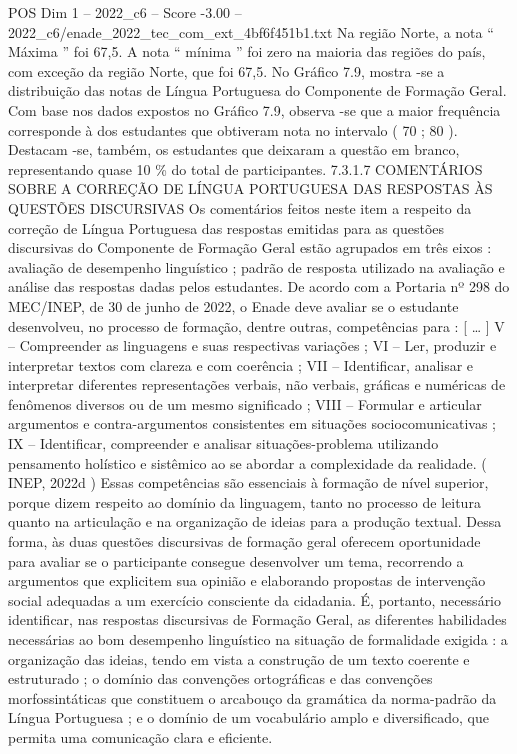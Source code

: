 \begin{textsample}{POS Dim 1 – 2022\_c6 – Score -3.00 – 2022\_c6/enade\_2022\_tec\_com\_ext\_4bf6f451b1.txt}
Na região Norte, a nota “ Máxima ” foi 67,5.
A nota “ mínima ” foi zero na maioria das regiões do país, com exceção da região Norte, que foi 67,5.
No Gráfico 7.9, mostra -se a distribuição das notas de Língua Portuguesa do Componente de Formação Geral.
Com base nos dados expostos no Gráfico 7.9, observa -se que a maior frequência corresponde à dos estudantes que obtiveram nota no intervalo ( 70 ; 80 ).
Destacam -se, também, os estudantes que deixaram a questão em branco, representando quase 10 \% do total de participantes. 7.3.1.7 COMENTÁRIOS SOBRE A CORREÇÃO DE LÍNGUA PORTUGUESA DAS RESPOSTAS ÀS QUESTÕES DISCURSIVAS Os comentários feitos neste item a respeito da correção de Língua Portuguesa das respostas emitidas para as questões discursivas do Componente de Formação Geral estão agrupados em três eixos : avaliação de desempenho linguístico ; padrão de resposta utilizado na avaliação e análise das respostas dadas pelos estudantes.
De acordo com a Portaria nº 298 do MEC/INEP, de 30 de junho de 2022, o Enade deve avaliar se o estudante desenvolveu, no processo de formação, dentre outras, competências para : [ … ] V – Compreender as linguagens e suas respectivas variações ; VI – Ler, produzir e interpretar textos com clareza e com coerência ; VII – Identificar, analisar e interpretar diferentes representações verbais, não verbais, gráficas e numéricas de fenômenos diversos ou de um mesmo significado ; VIII – Formular e articular argumentos e contra-argumentos consistentes em situações sociocomunicativas ; IX – Identificar, compreender e analisar situações-problema utilizando pensamento holístico e sistêmico ao se abordar a complexidade da realidade. ( INEP, 2022d ) Essas competências são essenciais à formação de nível superior, porque dizem respeito ao domínio da linguagem, tanto no processo de leitura quanto na articulação e na organização de ideias para a produção textual.
Dessa forma, às duas questões discursivas de formação geral oferecem oportunidade para avaliar se o participante consegue desenvolver um tema, recorrendo a argumentos que explicitem sua opinião e elaborando propostas de intervenção social adequadas a um exercício consciente da cidadania.
É, portanto, necessário identificar, nas respostas discursivas de Formação Geral, as diferentes habilidades necessárias ao bom desempenho linguístico na situação de formalidade exigida : a organização das ideias, tendo em vista a construção de um texto coerente e estruturado ; o domínio das convenções ortográficas e das convenções morfossintáticas que constituem o arcabouço da gramática da norma-padrão da Língua Portuguesa ; e o domínio de um vocabulário amplo e diversificado, que permita uma comunicação clara e eficiente.

\end{textsample}

